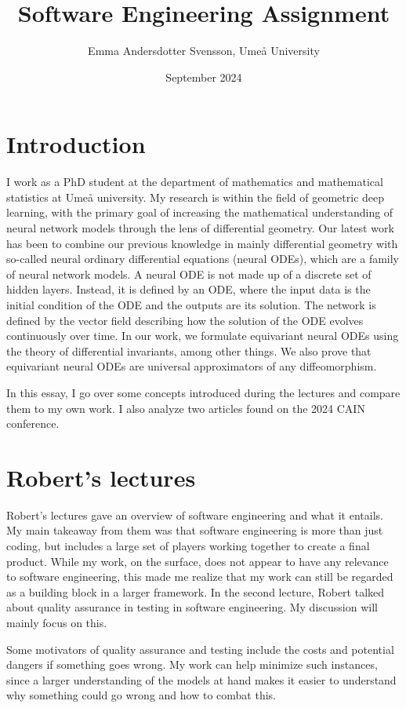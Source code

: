 \documentclass[11pt]{article}
\title{Software Engineering Assignment}
\author{Emma Andersdotter Svensson, Umeå University}
\date{September 2024}
\begin{document}
\maketitle

\section{Introduction}

I work as a PhD student at the department of mathematics and mathematical statistics at Umeå university. My research is within the field of geometric deep learning, with the primary goal of increasing the mathematical understanding of neural network models through the lens of differential geometry. Our latest work has been to combine our previous knowledge in mainly differential geometry with so-called neural ordinary differential equations (neural ODEs), which are a family of neural network models. A neural ODE is not made up of a discrete set of hidden layers. Instead, it is defined by an ODE, where the input data is the initial condition of the ODE and the outputs are its solution. The network is defined by the vector field describing how the solution of the ODE evolves continuously over time. In our work, we formulate equivariant neural ODEs using the theory of differential invariants, among other things. We also prove that equivariant neural ODEs are universal approximators of any diffeomorphism.

In this essay, I go over some concepts introduced during the lectures and compare them to my own work. I also analyze two articles found on the 2024 CAIN conference.

\section{Robert's lectures}
Robert's lectures gave an overview of software engineering and what it entails. My main takeaway from them was that software engineering is more than just coding, but includes a large set of players working together to create a final product. While my work, on the surface, does not appear to have any relevance to software engineering, this made me realize that my work can still be regarded as a building block in a larger framework. In the second lecture, Robert talked about quality assurance in testing in software engineering. My discussion will mainly focus on this.

Some motivators of quality assurance and testing include the costs and potential dangers if something goes wrong. My work can help minimize such instances, since a larger understanding of the models at hand makes it easier to understand why something could go wrong and how to combat this.
\end{document}
